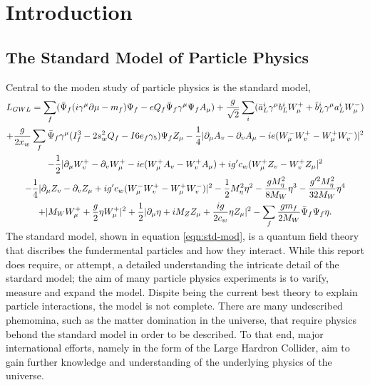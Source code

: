 \section{Introduction}

	\subsection{The Standard Model of Particle Physics}

    Central to the moden study of particle physics is the standard model,
    \vspace{-1em}
    \begin{multline} \label{eqn:std-mod}
      L_{GWL} = \sum_{f} ( \bar{\Psi}_{f} ( i \gamma^\mu \partial \mu - m_{f} ) \Psi_{f} - eQ_{f} \bar{\Psi}_{f} \gamma^\mu \Psi_{f} A_{\mu} ) + \frac{g}{\sqrt{2}} \sum_{i} ( \bar{a}^i_L \gamma^\mu b^i_L W^+_\mu + \bar{b}^i_L \gamma^\mu a^i_L W^-_\mu )                        \\                           
              + \frac{g}{2x_w} \sum_f \bar{\Psi}_f \gamma^\mu ( I^3_f - 2s^2_w Q_f - I6e_f \gamma_5 ) \Psi_f Z_\mu - \frac{1}{4} | \partial_\mu A_v - \partial_v A_\mu - ie(W^-_\mu W^+_v - W^+_\mu W^-_v ) |^2                                         \\                                     
              - \frac{1}{2} | \partial_\mu W^+_v - \partial_v W^+_\mu - ie ( W^+_\mu A_v - W^+_v A_\mu ) + ig' c_w (W^+_\mu Z_v - W^+_v Z_\mu |^2 \\
              - \frac{1}{4} | \partial_\mu Z_v - \partial_v Z_\mu + ig' c_w (W^-_\mu W^+_v - W^+_\mu W^-_v ) |^2 - \frac{1}{2} M^2_\eta \eta^2  - \frac{gM^2_\eta}{8M_W} \eta^3  - \frac{g'^2 M^2_\eta}{32M_W}\eta^4    \\     
              + | M_W W^+_\mu + \frac{g}{2} \eta W^+_\mu |^2 + \frac{1}{2} | \partial_\mu \eta + i M_Z Z_\mu + \frac{ig}{2c_w} \eta Z_\mu |^2 - \sum_f \frac{g m_f}{2 M_W} \bar{\Psi}_f \Psi_f \eta.                                                                                
      \vspace{-1em}
    \end{multline}
    \vspace{-1em}

    The standard model, shown in equation \ref{eqn:std-mod}, is a quantum field theory that discribes the fundermental particles and how they interact.
    While this report does require, or attempt, a detailed understanding the intricate detail of the stardard model;
    the aim of many particle physics experiments is to varify, measure and expand the model.
    Dispite being the current best theory to explain particle interactions, the model is not complete.
    There are many undescribed phemomina, such as the matter domination in the universe, that require physics behond the standard model in order to be described.
    To that end, major international efforts, namely in the form of the Large Hardron Collider, aim to gain further knowledge and understanding of the underlying physics of the universe. \cite{ref:std}


